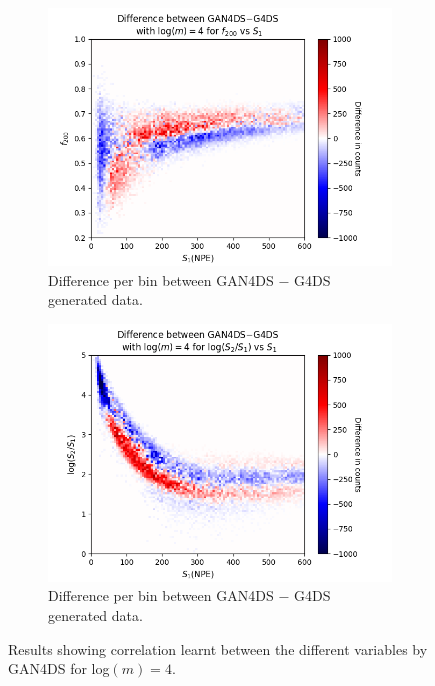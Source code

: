 \documentclass[11pt]{article} %
\begin{document}
\begin{figure}[H]
\begin{minipage}{\textwidth}
\end{minipage}
\begin{minipage}{\textwidth}
  \begin{subfigure}{.5\textwidth}
      \centering\captionsetup{width=.9\linewidth}%
      \includegraphics[scale=0.6]{./images/4/difference_f200_vs_s1.png}
      \caption{Difference per bin between GAN4DS $-$ G4DS generated data.}
  \end{subfigure}
  \begin{subfigure}{.5\textwidth}
      \centering\captionsetup{width=.9\linewidth}%
      \includegraphics[scale=0.6]{./images/4/difference_s1_over_s2_vs_s1.png}
      \caption{Difference per bin between GAN4DS $-$ G4DS generated data.}
  \end{subfigure}
\end{minipage}
\caption{Results showing correlation learnt between the different variables by GAN4DS for log$(m)=4$.}
\label{fig:corr_results_4}
\end{figure}
\end{document}
